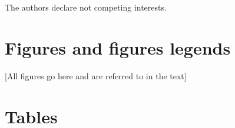 \documentclass[english]{article}
\begin{document}
The authors declare not competing interests.

\section*{Figures and figures legends}



[All figures go here and are referred to in the text]

\section*{Tables}



\end{document}
